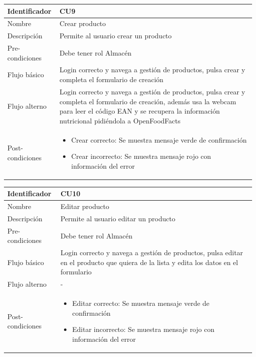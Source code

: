 \vspace{1em}
\par
\begin{tabular}{||p{3cm}|p{11cm}||} 
\hline
Identificador & CU9 \\ [0.5ex] 
\hline\hline
Nombre & Crear producto \\ 
\hline
Descripción & Permite al usuario crear un producto \\
\hline
Pre-condiciones & Debe tener rol Almacén \\
\hline
Flujo básico & Login correcto y navega a gestión de productos, pulsa crear y completa el formulario de creación \\
\hline
Flujo alterno & Login correcto y navega a gestión de productos, pulsa crear y completa el formulario de creación, además usa la webcam para leer el código EAN y se recupera la información nutricional pidiéndola a OpenFoodFacts \\
\hline
Post-condiciones &
\begin{itemize}
    \item Crear correcto: Se muestra mensaje verde de confirmación
    \item Crear incorrecto: Se muestra mensaje rojo con información del error
\end{itemize} \\
\hline
\end{tabular}

\vspace{1em}
\par
\begin{tabular}{||p{3cm}|p{11cm}||} 
\hline
Identificador & CU10 \\ [0.5ex] 
\hline\hline
Nombre & Editar producto \\ 
\hline
Descripción & Permite al usuario editar un producto \\
\hline
Pre-condiciones & Debe tener rol Almacén \\
\hline
Flujo básico & Login correcto y navega a gestión de productos, pulsa editar en el producto que quiera de la lista y edita los datos en el formulario \\
\hline
Flujo alterno & - \\
\hline
Post-condiciones &
\begin{itemize}
    \item Editar correcto: Se muestra mensaje verde de confirmación
    \item Editar incorrecto: Se muestra mensaje rojo con información del error
\end{itemize} \\
\hline
\end{tabular}

